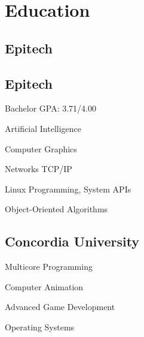 \documentclass[]{resume-openfont}
\begin{document}
\noindent%
\begin{minipage}[t]{0.31\textwidth}



\section{Education}

\subsection{Epitech}
\subtitle{Master in Computer Science}
\sectionsep

\subsection{Epitech}
\subtitle{BS in Computer Science}
Bachelor GPA: 3.71/4.00
\vspace{0.8\topsep} %
\begin{coursework}
\item Artificial Intelligence
\item Computer Graphics
\item Networks TCP/IP
\item Linux Programming, System APIs
\item Object-Oriented Algorithms
\end{coursework}
\sectionsep

\subsection{Concordia University}
\subtitle{Visiting student in Computer Sciences, Graduate Level}
\begin{coursework}
\item Multicore Programming
\item Computer Animation
\item Advanced Game Development
\item Operating Systems
\end{coursework}



\end{minipage}
\end{document}
